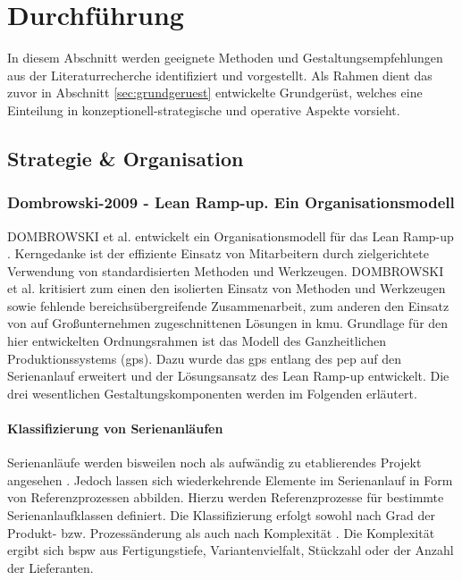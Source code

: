 
\chapter{Durchführung}\label{sec:durchfuehrung}
In diesem Abschnitt werden geeignete Methoden und Gestaltungsempfehlungen aus der Literaturrecherche identifiziert und vorgestellt. Als Rahmen dient das zuvor in Abschnitt \ref{sec:grundgeruest}
entwickelte Grundgerüst, welches eine Einteilung in konzeptionell-strategische und operative Aspekte vorsieht. 

\section{Strategie \& Organisation}

\subsection*{Dombrowski-2009 - Lean Ramp-up. Ein Organisationsmodell}\label{dom09}

DOMBROWSKI et al. entwickelt ein Organisationsmodell für das Lean Ramp-up \cite{Dombrowski2009}. Kerngedanke ist der effiziente Einsatz von Mitarbeitern durch zielgerichtete Verwendung von standardisierten Methoden und Werkzeugen. DOMBROWSKI et al. kritisiert zum einen den isolierten Einsatz von Methoden und Werkzeugen sowie fehlende bereichsübergreifende Zusammenarbeit, zum anderen den Einsatz von auf Großunternehmen zugeschnittenen Lösungen in \gls{kmu}. 
Grundlage für den hier entwickelten Ordnungsrahmen ist das Modell des Ganzheitlichen Produktionssystems (\gls{gps}). Dazu wurde das \gls{gps} entlang des \gls{pep} auf den Serienanlauf erweitert und der Lösungsansatz des Lean Ramp-up entwickelt. Die drei wesentlichen Gestaltungskomponenten werden im Folgenden erläutert. 

\subsubsection{Klassifizierung von Serienanläufen}
Serienanläufe werden bisweilen noch als aufwändig zu etablierendes Projekt angesehen \cite{Kuhn2002}. Jedoch lassen sich wiederkehrende Elemente im Serienanlauf in Form von Referenzprozessen abbilden. Hierzu werden Referenzprozesse für bestimmte Serienanlaufklassen definiert. Die Klassifizierung erfolgt sowohl nach Grad der Produkt- bzw. Prozessänderung \cite{Kuhn2002, Hertrampf2008} als auch nach Komplexität
.
Die Komplexität ergibt sich \gls{bspw} aus Fertigungstiefe, Variantenvielfalt, Stückzahl oder der Anzahl der Lieferanten.

